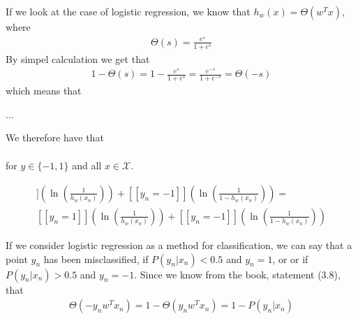 If we look at the case of logistic regression, we know that $h_w(x) = \Theta(w^T x)$, where
\begin{align}
\Theta(s) = \frac{e^s}{1+e^s}
\end{align}
By simpel calculation we get that
\begin{align}
1 - \Theta(s) = 1 - \frac{e^s}{1+e^s} = \frac{e^{-s}}{1+e^{-s}} = \Theta(-s)
\end{align}
which means that

...

We therefore have that
\begin{align}

\end{align}

for $y\in \{-1,1 \}$ and all $x\in \mathcal{X}$.

\begin{align}
[[y_n = 1]]\left(\ln \left( \frac{1}{h_w(x_n)}\right)\right) + [[y_n = -1]]\left(\ln \left( \frac{1}{1 - h_w(x_n)}\right)\right) = \\ 
[[y_n = 1]]\left(\ln \left( \frac{1}{h_w(x_n)}\right)\right) + [[y_n = -1]]\left(\ln \left( \frac{1}{1 - h_w(x_n)}\right)\right)
\end{align}






If we consider logistic regression as a method for classification, we can say that a point $y_n$ has been misclassified, if $P(y_n|x_n) < 0.5$ and $y_n = 1$, or or if $P(y_n|x_n) > 0.5$ and $y_n = -1$. Since we know from the book, statement (3.8), that 
\begin{align}
\Theta(-y_n w^T x_n) = 1 - \Theta(y_n w^T x_n) = 1 - P(y_n | x_n)
\end{align}
